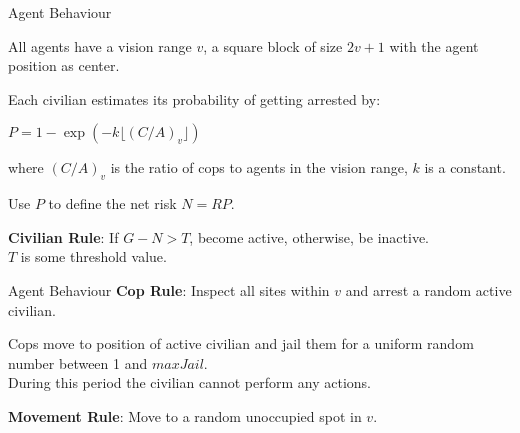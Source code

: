 \documentclass[red]{beamer}
\begin{document}
\begin{frame}{Agent Behaviour}
  \small{
  All agents have a vision range $v$, a square block of size $2v + 1$ with the agent position as center.

  \vspace{10pt}

  Each civilian estimates its probability of getting arrested by:\\
  \vspace{10pt}
  \begin{center}
  $P = 1 - \exp(-k \lfloor(C/A)_v\rfloor)$
  \end{center}
  \vspace{10pt}
  where $(C/A)_v$ is the ratio of cops to agents in the vision range, $k$ is a constant.

  \vspace{10pt}

  Use $P$ to define the net risk $N = RP$.

  \vspace{10pt}
  \textbf{Civilian Rule}: If $G - N > T$, become active, otherwise, be inactive.\\
  $T$ is some threshold value.
}
\end{frame}

\begin{frame}{Agent Behaviour}
  \textbf{Cop Rule}: Inspect all sites within $v$ and arrest a random active civilian.

  \vspace{10pt}

  Cops move to position of active civilian and jail them for a uniform random number between 1 and $maxJail$.\\
  During this period the civilian cannot perform any actions.

  \vspace{10pt}

  \textbf{Movement Rule}: Move to a random unoccupied spot in $v$.
\end{frame}
\end{document}
